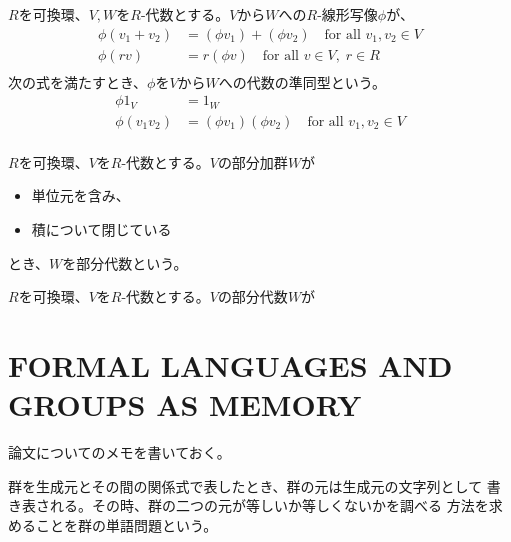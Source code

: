 	\begin{definition}[代数の準同型]\label{def:代数の準同型} %
		$R$を可換環、$V,W$を$R$-代数とする。$V$から$W$への$R$-線形写像$\phi$が、
		\begin{equation*}\begin{split} %
			\phi(v_1+v_2) &= (\phi v_1) + (\phi v_2)
				\quad\text{for all }v_1,v_2\in V \\
			\phi(rv) &= r(\phi v)
				\quad\text{for all }v\in V,\;r\in R \\
		\end{split}\end{equation*} %
		次の式を満たすとき、$\phi$を$V$から$W$への代数の準同型という。
		\begin{equation*}\begin{split} %
			\phi 1_V &= 1_W \\
			\phi(v_1v_2) &= (\phi v_1)(\phi v_2) 
				\quad\text{for all }v_1,v_2\in V \\
		\end{split}\end{equation*} %
	\end{definition} %

	\begin{definition}[部分代数]\label{def:部分代数} %
		$R$を可換環、$V$を$R$-代数とする。$V$の部分加群$W$が
		\begin{itemize}\setlength{\itemsep}{-1mm} %
			\item 単位元を含み、
			\item 積について閉じている
		\end{itemize} %
		とき、$W$を部分代数という。
	\end{definition} %

	\begin{definition}[イデアル]\label{def:イデアル} %
		$R$を可換環、$V$を$R$-代数とする。$V$の部分代数$W$が
	\end{definition} %
\section{FORMAL LANGUAGES AND GROUPS AS MEMORY}\label{s1:FORMAL LANGUAGES AND GROUPS AS MEMORY} %
	論文\cite{arxiv:kambites:chomsky}についてのメモを書いておく。

	\begin{definition}[群の単語問題]\label{def:群の単語問題} %
		群を生成元とその間の関係式で表したとき、群の元は生成元の文字列として
		書き表される。その時、群の二つの元が等しいか等しくないかを調べる
		方法を求めることを群の単語問題という。
	\end{definition} %

